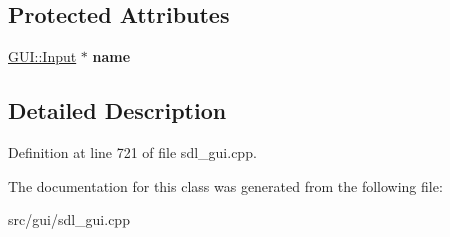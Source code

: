 \subsection*{Protected Attributes}
\begin{DoxyCompactItemize}
\item 
\hypertarget{classSetLocalSize_a04b30f6369fc83b25a0047080f78fa2c}{\hyperlink{classGUI_1_1Input}{G\-U\-I\-::\-Input} $\ast$ {\bfseries name}}\label{classSetLocalSize_a04b30f6369fc83b25a0047080f78fa2c}

\end{DoxyCompactItemize}


\subsection{Detailed Description}


Definition at line 721 of file sdl\-\_\-gui.\-cpp.



The documentation for this class was generated from the following file\-:\begin{DoxyCompactItemize}
\item 
src/gui/sdl\-\_\-gui.\-cpp\end{DoxyCompactItemize}

